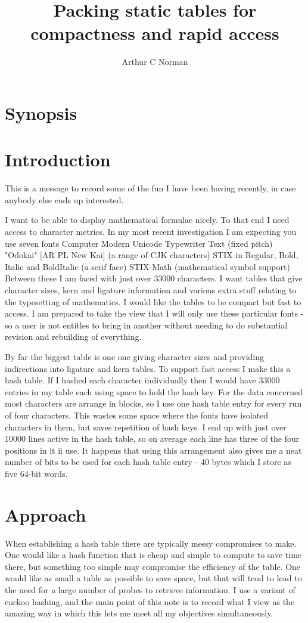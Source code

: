 \documentclass [a4paper,11pt]{article}
\title{Packing static tables for compactness and rapid access}
\author{Arthur C Norman}
\begin{document}
\maketitle
\section{Synopsis}
\section{Introduction}
This is a message to record some of the fun I have been having recently, 
in case anybody else ends up interested.

I want to be able to display mathematical formulae nicely. To that end I 
need access to character metrics. In my most recent investigation I am 
expecting you use seven fonts
   Computer Modern Unicode Typewriter Text  (fixed pitch)
   "Odokai" [AR PL New Kai]                 (a range of CJK characters)
   STIX in Regular, Bold, Italic and BoldItalic (a serif face)
   STIX-Math                                (mathematical symbol support)
Between these I am faced with just over 33000 characters. I want tables 
that give character sizes, kern and ligature information and various extra 
stuff relating to the typesetting of mathematics. I would like the tables 
to be compact but fast to access. I am prepared to take the view that I 
will only use these particular fonts - so a user is not entitles to bring 
in another without needing to do substantial revision and rebuilding of 
everything.

By far the biggest table is one one giving character sizes and providing 
indirections into ligature and kern tables. To support fast access I make 
this a hash table. If I hashed each character individually then I would 
have 33000 entries in my table each using space to hold the hash key. For 
the data concerned most characters are arrange in blocks, so I use one 
hash table entry for every run of four characters. This wastes some space 
where the fonts have isolated characters in them, but saves repetition of 
hash keys. I end up with just over 10000 lines active in the hash table, 
so on average each line has three of the four positions in it ii use. It 
happens that using this arrangement also gives me a neat number of bits to 
be used for each hash table entry - 40 bytes which I store as five 64-bit 
words.

\section{Approach}
When establishing a hash table there are typically messy compromises to 
make. One would like a hash function that is cheap and simple to compute 
to save time there, but something too simple may compromise the efficiency 
of the table. One would like as small a table as possible to save space, 
but that will tend to lead to the need for a large number of probes to 
retrieve information. I use a variant of cuckoo hashing, and the main 
point of this note is to record what I view as the amazing way in which 
this lets me meet all my objectives simultaneously.
\end{document}
